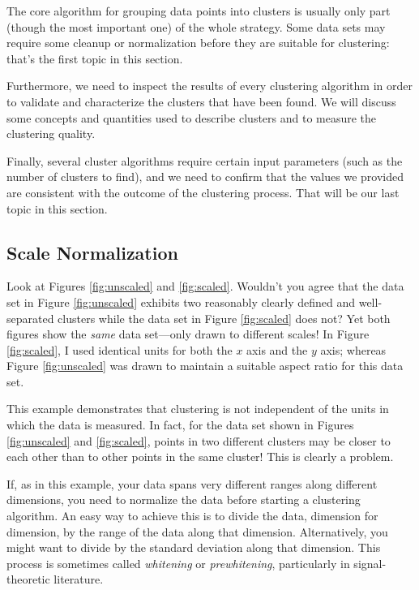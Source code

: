 
The core algorithm for grouping data points into clusters is usually
only part (though the most important one) of the whole strategy. Some
data sets may require some cleanup or normalization before they are
suitable for clustering: that's the first topic in this section.

Furthermore, we need to inspect the results of every clustering
algorithm in order to validate and characterize the clusters that have
been found.  We will discuss some concepts and quantities used to
describe clusters and to measure the clustering quality.

Finally, several cluster algorithms require certain input parameters
(such as the number of clusters to find), and we need to confirm that
the values we provided are consistent with the outcome of the
clustering process. That will be our last topic in this section.

\subsection{Scale Normalization}

 
Look at Figures \ref{fig:unscaled} and \ref{fig:scaled}. Wouldn't you
agree that the data set in Figure \ref{fig:unscaled} exhibits two
reasonably clearly defined and well-separated clusters while the data
set in Figure \ref{fig:scaled} does not? Yet both figures show the
\emph{same} data set---only drawn to different scales! In Figure
\ref{fig:scaled}, I used identical units for both the $x$ axis and the
$y$ axis; whereas Figure \ref{fig:unscaled} was drawn to maintain a
suitable aspect ratio for this data set.

This example demonstrates that clustering is not independent of the
units in which the data is measured. In fact, for the data set shown
in Figures \ref{fig:unscaled} and \ref{fig:scaled}, points in two
different clusters may be closer to each other than to other points in
the same cluster! This is clearly a problem.

If, as in this example, your data spans very different ranges along
different dimensions, you need to normalize the data before starting a
clustering algorithm. An easy way to achieve this is to divide the
data, dimension for dimension, by the range of the data along that
dimension.  Alternatively, you might want to divide by the standard
deviation along that dimension. This process is sometimes called
\emph{whitening}  or \emph{prewhitening}, 
particularly in signal-theoretic literature.


